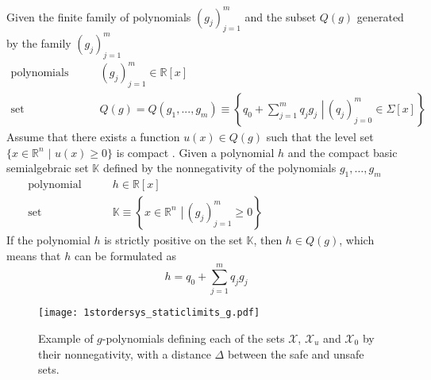  
\vspace{-2mm}
\begin{thm}\label{def:putinar}
Given the finite family of polynomials $(g_j)_{j=1}^m$ and the subset $Q(g)$ %
generated by the family $(g_j)_{j=1}^m$ \citep[p 29]{bib:sos_putinar_lasserre}
\begin{subequations}\label{eq:putinar}
\begin{align}
\text{polynomials} \qquad & (g_j)_{j=1}^m \in\mathbb{R}[x]\label{eq:polynomials_g}\\
\text{set} \qquad & Q(g)=Q(g_1,...,g_m)\equiv\left\{\left.q_0+\sum\limits_{j=1}^{m}q_jg_j\,\,\right| \, (q_j)_{j=0}^m\in\Sigma[x]\right\}\label{eq:putinar_set_sos}
\end{align}
\end{subequations}
Assume that there exists a function $u(x)\in Q(g)$ such that the level set $\{x\in\mathbb{R}^n \,\,|\,\, u(x)\geq 0\}$ is compact \citep[p 29]{bib:sos_putinar_lasserre}.
Given a polynomial $h$ and the compact basic semialgebraic set $\mathbb{K}$  defined by the nonnegativity of the polynomials $g_1,\dots, g_m$  
\begin{subequations}
\begin{align}
\text{polynomial} \qquad & h \in\mathbb{R}[x]\\
\text{set} \qquad & \mathbb{K}\equiv\left\{\left.x\in \mathbb{R}^n\,\, \right| \, (g_j)_{j=1}^m\geq0\right\}\qquad\qquad\qquad\qquad\qquad\quad\label{eq:setK}
\end{align}
\end{subequations}
If the polynomial $h$ is strictly positive on the set $\mathbb{K}$, then $h\in Q(g)$, which means that $h$  can be formulated as
\begin{equation}\label{eq:sos_barrier}
h = q_0+\sum\limits_{j=1}^{m}q_jg_j
\end{equation}
\end{thm}

\vspace{-16mm}
\begin{figure}[H]
\centering
\texttt{[image: 1stordersys\_staticlimits\_g.pdf]}
\caption{Example of $g$-polynomials defining each of the sets $\mathcal{X}$, $\mathcal{X}_u$ and $\mathcal{X}_0$ by their nonnegativity, with a distance $\Delta$ between the safe and unsafe sets.}
\label{fig:1stordersys_staticlimits_g}
\end{figure}

